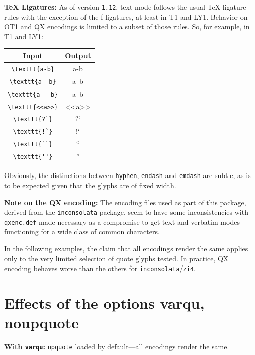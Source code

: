 \documentclass[11pt]{article}
\begin{document}
{\textbf{TeX Ligatures:} As of version {\tt 1.12}, text mode follows the usual TeX ligature rules with the exception of the f-ligatures, at least in T1 and LY1. Behavior on OT1 and QX encodings is limited to a subset of those rules. So, for example, in T1 and LY1:
\begin{center}
  \begin{tabular}{@{} cc @{}}
    \toprule
    Input & Output \\ 
    \midrule
    \verb|\texttt{a-b}| & a-b \\ %
	\verb|\texttt{a--b}| & a--b\\ %
	\verb|\texttt{a---b}| & a--b \\ %
	\verb|\texttt{<<a>>}| & <<a>> \\ %
    \verb|\texttt{?`}| & ?` \\ %
    \verb|\texttt{!`}| & !` \\ %
    \verb|\texttt{``}| & `` \\ %
    \verb|\texttt{''}| & '' \\ %
    \bottomrule
  \end{tabular}
\end{center}

Obviously, the distinctions between {\tt hyphen}, {\tt endash} and {\tt emdash} are subtle, as is to be expected given that  the glyphs are of fixed width.

\textbf{Note on the QX encoding:} The encoding files used as part of this package, derived from the \texttt{inconsolata} package, seem to have some inconsistencies with \texttt{qxenc.def} made necessary as a compromise to get text and verbatim modes functioning for a wide class of common characters.

In the following examples, the claim that all encodings render the same applies only to the very limited selection of quote glyphs tested. In practice, QX encoding behaves worse than the others for \texttt{inconsolata}/\texttt{zi4}.


\section*{Effects of the options varqu, noupquote}
\textbf{With \texttt{varqu}:} \texttt{upquote} loaded by default---all encodings render the same.

}
\end{document}
